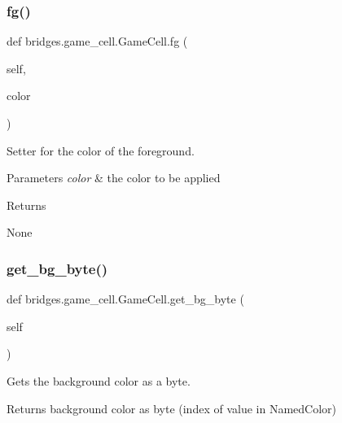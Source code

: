 \subsubsection{\texorpdfstring{fg()}{fg()}\hspace{0.1cm}{\footnotesize\ttfamily [2/2]}}
{\footnotesize\ttfamily def bridges.\+game\+\_\+cell.\+Game\+Cell.\+fg (\begin{DoxyParamCaption}\item[{}]{self,  }\item[{}]{color }\end{DoxyParamCaption})}



Setter for the color of the foreground. 


\begin{DoxyParams}{Parameters}
{\em color} & the color to be applied \\
\hline
\end{DoxyParams}
\begin{DoxyReturn}{Returns}


None 
\end{DoxyReturn}
\mbox{\label{classbridges_1_1game__cell_1_1_game_cell_a5ab6deab003f6c35d7bd8f18d4fecf7b}} 
\subsubsection{\texorpdfstring{get\+\_\+bg\+\_\+byte()}{get\_bg\_byte()}}
{\footnotesize\ttfamily def bridges.\+game\+\_\+cell.\+Game\+Cell.\+get\+\_\+bg\+\_\+byte (\begin{DoxyParamCaption}\item[{}]{self }\end{DoxyParamCaption})}



Gets the background color as a byte. 

\begin{DoxyReturn}{Returns}
background color as byte (index of value in Named\+Color) 
\end{DoxyReturn}
\mbox{\label{classbridges_1_1game__cell_1_1_game_cell_af03e7efba5661d3a9fd1e14dc3128fc5}} 
